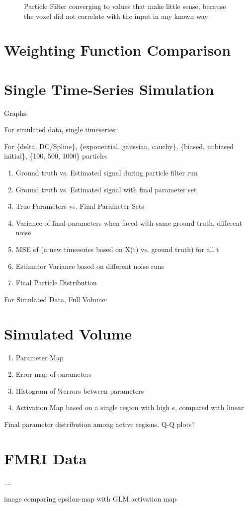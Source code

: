 \begin{figure}
\caption{Particle Filter converging to values that make little sense,
because the voxel did not correlate with the input in any known way}
\end{figure}

\section{Weighting Function Comparison}
\label{sec:Results Weights}

\section{Single Time-Series Simulation}

Graphs: 

For simulated data, single timeseries:

For \{delta, DC/Spline\}, \{exponential, gaussian, cauchy\}, \{biased, unbiased initial\},
\{100, 500, 1000\} particles
\begin{enumerate}
\item Ground truth vs. Estimated signal during particle filter run
\item Ground truth vs. Estimated signal with final parameter set
\item True Parameters vs. Final Parameter Sets
\item Variance of final parameters when faced with same ground truth, different noise
\item MSE of (a new timeseries based on X(t) vs. ground truth) for all t
\item Estimator Variance based on different noise runs
\item Final Particle Distribution
\end{enumerate}

For Simulated Data, Full Volume:

\section{Simulated Volume}
\begin{enumerate}
\item Parameter Map 
\item Error map of parameters
\item Histogram of \%errors between parameters
\item Activation Map based on a single region with high $\epsilon$, compared with linear
\end{enumerate}

Final parameter distribution among active regions.
Q-Q plots?

\section{FMRI Data}
....

image comparing epsilon-map with GLM activation map

